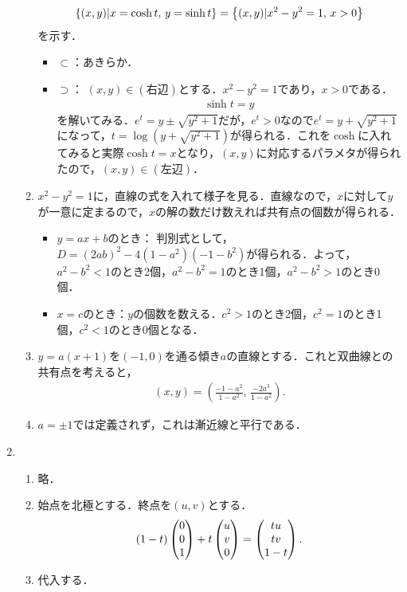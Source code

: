 \documentclass[9pt]{ltjsarticle}
\theoremstyle{break}
\theoremstyle{break}
\theoremstyle{break}
\theoremstyle{break}
\theoremstyle{break}
\theoremstyle{break}
\theoremstyle{break}
\theoremstyle{break}
\theoremstyle{break}
\theoremstyle{break}
\theoremstyle{break}
\theoremstyle{break}
\theoremstyle{break}
\theoremstyle{break}
\theoremstyle{break}
\theoremstyle{nonumberbreak}
\theoremstyle{nonumberbreak}
\begin{document}
\begin{enumerate}[label=(問題\arabic*)]
\begin{enumerate}[label=(\alph*)]
\begin{align}
 \left\{(x,y)| x=\cosh t,\, y=\sinh t\right\} = \left\{(x,y) | x^2-y^2=1,\, x>0\right\}
\end{align}
を示す．
\begin{itemize}
 \item $\subset$：あきらか．
 \item $\supset$：
$(x,y)\in (右辺)$とする．$x^2-y^2=1$であり，$x>0$である．
\begin{align}
 \sinh t = y
\end{align}
を解いてみる．$e^t=y\pm \sqrt{y^2+1}$だが，$e^t>0$なので$e^t=y+\sqrt{y^2+1}$になって，$t=\log(y+\sqrt{y^2+1})$が得られる．これを$\cosh$に入れてみると実際$\cosh t = x$となり，$(x,y)$に対応するパラメタが得られたので，$(x,y)\in (左辺)$．
\end{itemize}
 \item $x^2-y^2=1$に，直線の式を入れて様子を見る．直線なので，$x$に対して$y$が一意に定まるので，$x$の解の数だけ数えれば共有点の個数が得られる．
\begin{itemize}
 \item $y=ax+b$のとき：
判別式として，$D=(2ab)^2-4(1-a^2)(-1-b^2)$が得られる．よって，
$a^2-b^2 < 1$のとき2個，$a^2-b^2=1$のとき1個，$a^2-b^2 > 1$のとき0個．
 \item $x=c$のとき：$y$の個数を数える．$c^2>1$のとき2個，$c^2=1$のとき1個，$c^2<1$のとき0個となる．
\end{itemize}
 \item $y=a(x+1)$を$(-1,0)$を通る傾き$a$の直線とする．これと双曲線との共有点を考えると，
\begin{align}
 (x,y) = (\frac{-1-a^2}{1-a^2},\, \frac{-2a^3}{1-a^2}).
\end{align}
 \item $a=\pm 1$では定義されず，これは漸近線と平行である．
\end{enumerate}
 \item
\begin{enumerate}[label=(\alph*)]
 \item 略．
 \item 始点を北極とする．終点を$(u,v)$とする．
\begin{align}
 (1-t)\left(\begin{matrix} 0 \\ 0 \\ 1 \end{matrix}\right) + t \left(\begin{matrix} u \\ v \\ 0 \end{matrix}\right) = \left(\begin{matrix} tu \\ tv \\ 1-t \end{matrix}\right).
\end{align}
 \item 代入する．

\end{enumerate}
\end{enumerate}
\end{document}
